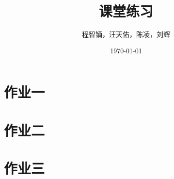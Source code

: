 \documentclass{article}
\title{课堂练习}
\author{程智镝，汪天佑，陈凌，刘辉}
\date{\today}
\begin{document}
\maketitle
\section*{作业一}
\section*{作业二}
\section*{作业三}
\end{document}
